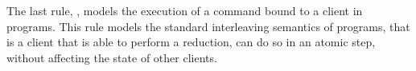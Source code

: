 The last rule, , models the execution of a command bound to a client in programs. 
This rule models the standard interleaving semantics of programs, that is a client that is able to 
perform a reduction, can do so in an atomic step, without affecting the state of other clients.



